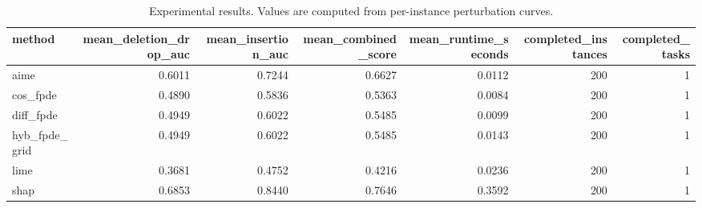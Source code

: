 \begin{table}[t]
\caption{Experimental results. Values are computed from per-instance perturbation curves.}
\label{tab:main_results_computed}
\centering
\begin{tabular}{lrrrrrr}
\toprule
method & mean\_deletion\_drop\_auc & mean\_insertion\_auc & mean\_combined\_score & mean\_runtime\_seconds & completed\_instances & completed\_tasks \\
\midrule
aime & 0.6011 & 0.7244 & 0.6627 & 0.0112 & 200 & 1 \\
cos\_fpde & 0.4890 & 0.5836 & 0.5363 & 0.0084 & 200 & 1 \\
diff\_fpde & 0.4949 & 0.6022 & 0.5485 & 0.0099 & 200 & 1 \\
hyb\_fpde\_grid & 0.4949 & 0.6022 & 0.5485 & 0.0143 & 200 & 1 \\
lime & 0.3681 & 0.4752 & 0.4216 & 0.0236 & 200 & 1 \\
shap & 0.6853 & 0.8440 & 0.7646 & 0.3592 & 200 & 1 \\
\bottomrule
\end{tabular}

\end{table}
